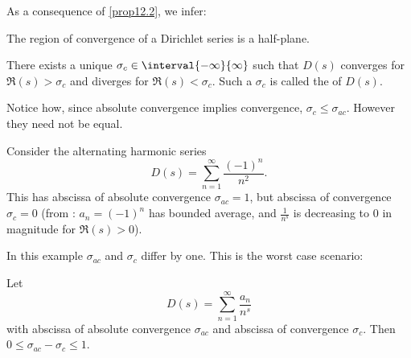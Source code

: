 


\begin{remark}
	As a consequence of \autoref{prop12.2}, we infer:
	\begin{items}
		\item The region of convergence of a Dirichlet series is a half-plane.
		\item There exists a unique $\sigma_c \in \interval{-\infty}{\infty}$ such that $D(s)$ converges for $\Re(s) > \sigma_c$ and diverges for $\Re(s) < \sigma_c$.
		Such a $\sigma_c$ is called the  of $D(s)$.
	\end{items}
\end{remark}

Notice how, since absolute convergence implies convergence, $\sigma_c \leq \sigma_{ac}$.
However they need not be equal.

\begin{example}
	Consider the alternating harmonic series
	\[
		D(s) = \sum_{n = 1}^\infty \frac{(-1)^n}{n^2}.
	\]
	This has abscissa of absolute convergence $\sigma_{ac} = 1$, but abscissa of convergence $\sigma_c = 0$ (from : $a_n = (-1)^n$ has bounded average, and $\frac{1}{n^s}$ is decreasing to $0$ in magnitude for $\Re(s) > 0$).
\end{example}

In this example $\sigma_{ac}$ and $\sigma_c$ differ by one.
This is the worst case scenario:

\begin{proposition}\label{prop12.3}
	Let
	\[
		D(s) = \sum_{n = 1}^\infty \frac{a_n}{n^s}
	\]
	with abscissa of absolute convergence $\sigma_{ac}$ and abscissa of convergence $\sigma_c$.
	Then $0 \leq \sigma_{ac} - \sigma_c \leq 1$.
\end{proposition}

